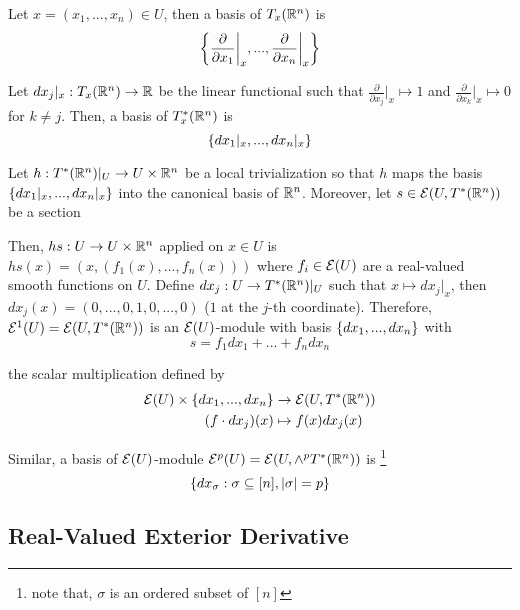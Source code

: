 \begin{definition}
	Let $x = (x_1, ..., x_n) \in U$, then a basis of $T_x(\R^n)$ is
	$$
	\set*{\frac{\partial}{\partial x_1}\bigg\vert_x, ..., \frac{\partial}{\partial x_n}\bigg\vert_x}
	$$
	
	Let $dx_j\vert_x: T_x(\R^n) \to \R$ be the linear functional such that $\frac{\partial}{\partial x_j}\vert_x \mapsto 1$ and $\frac{\partial}{\partial x_k}\vert_x \mapsto 0$ for $k \neq j$. Then, a basis of $T_x^*(\R^n)$ is
	$$
	\set{dx_1\vert_x, ..., dx_n\vert_x}
	$$
	
	Let $h: T^*(\R^n)\vert_U \to U \times \R^n$ be a local trivialization so that $h$ maps the basis $\set{dx_1\vert_x, ..., dx_n\vert_x}$ into the canonical basis of $\R^n$. Moreover, let $s \in \E(U, T^*(\R^n))$ be a section
	
	\begin{center}
	\end{center}
	
	Then, $hs: U \to U \times \R^n$ applied on $x \in U$ is $	hs(x) = (x, (f_1(x), ..., f_n(x)))$	 where $f_i \in \E(U)$ are a real-valued smooth functions on $U$. Define $dx_j: U \to T^*(\R^n)\vert_U$ such that $x \mapsto dx_j\vert_x$, then $dx_j(x) = (0, ..., 0, 1, 0, ..., 0)$ ($1$ at the $j$-th coordinate). Therefore, $\E^1(U) = \E(U, T^*(\R^n))$ is an $\E(U)$-module with basis $\set{dx_1, ..., dx_n}$ with 
	$$
	s = f_1 dx_1 + ... + f_n dx_n
	$$
	
	the scalar multiplication defined by
	\begin{align*}
		\E(U) \times \set{dx_1, ..., dx_n} &\to \E(U, T^*(\R^n)) \\
		(f \cdot dx_j)(x) &\mapsto f(x) dx_j(x)
	\end{align*}
	
	Similar, a basis of $\E(U)$-module $\E^p(U) = \E(U, \wedge^p T^*(\R^n))$ is \footnote{note that, $\sigma$ is an ordered subset of $[n]$}
	$$
	\set*{dx_\sigma: \sigma \subseteq [n], |\sigma| = p}
	$$
\end{definition}

\subsection{Real-Valued Exterior Derivative}

